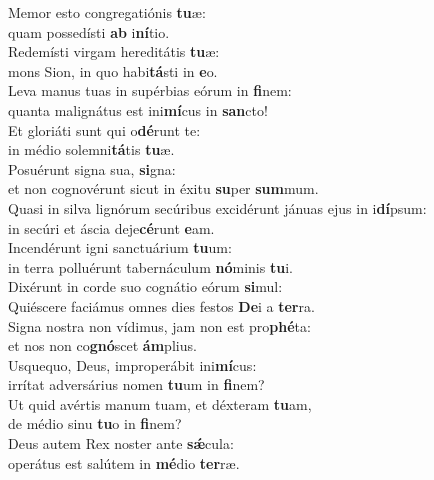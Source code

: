 \evenverse Memor esto congregatiónis \textbf{tu}æ:~\*\\
\evenverse quam possedísti \textbf{ab} i\textbf{ní}tio.\\
\oddverse Redemísti virgam hereditátis \textbf{tu}æ:~\*\\
\oddverse mons Sion, in quo habi\textbf{tá}sti in \textbf{e}o.\\
\evenverse Leva manus tuas in supérbias eórum in \textbf{fi}nem:~\*\\
\evenverse quanta malignátus est ini\textbf{mí}cus in \textbf{san}cto!\\
\oddverse Et gloriáti sunt qui o\textbf{dé}runt te:~\*\\
\oddverse in médio solemni\textbf{tá}tis \textbf{tu}æ.\\
\evenverse Posuérunt signa sua, \textbf{si}gna:~\*\\
\evenverse et non cognovérunt sicut in éxitu \textbf{su}per \textbf{sum}mum.\\
\oddverse Quasi in silva lignórum secúribus excidérunt jánuas ejus in i\textbf{dí}psum:~\*\\
\oddverse in secúri et áscia deje\textbf{cé}runt \textbf{e}am.\\
\evenverse Incendérunt igni sanctuárium \textbf{tu}um:~\*\\
\evenverse in terra polluérunt tabernáculum \textbf{nó}minis \textbf{tu}i.\\
\oddverse Dixérunt in corde suo cognátio eórum \textbf{si}mul:~\*\\
\oddverse Quiéscere faciámus omnes dies festos \textbf{De}i a \textbf{ter}ra.\\
\evenverse Signa nostra non vídimus, jam non est pro\textbf{phé}ta:~\*\\
\evenverse et nos non co\textbf{gnó}scet \textbf{ám}plius.\\
\oddverse Usquequo, Deus, improperábit ini\textbf{mí}cus:~\*\\
\oddverse irrítat adversárius nomen \textbf{tu}um in \textbf{fi}nem?\\
\evenverse Ut quid avértis manum tuam, et déxteram \textbf{tu}am,~\*\\
\evenverse de médio sinu \textbf{tu}o in \textbf{fi}nem?\\
\oddverse Deus autem Rex noster ante \textbf{sǽ}cula:~\*\\
\oddverse operátus est salútem in \textbf{mé}dio \textbf{ter}ræ.\\

